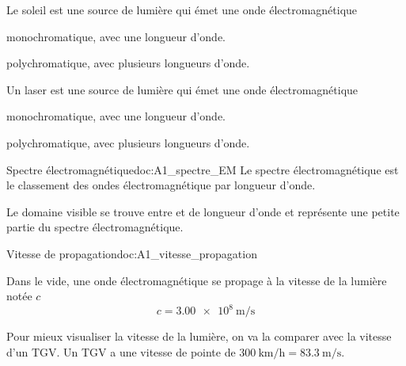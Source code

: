 \begin{qcm}{
  Le soleil est une source de lumière qui émet une onde électromagnétique
}
  \item monochromatique, avec une longueur d'onde.
  \item \reponseQCM polychromatique, avec plusieurs longueurs d'onde.
\end{qcm}

\begin{qcm}{
  Un laser est une source de lumière qui émet une onde électromagnétique
}
  \item \reponseQCM monochromatique, avec une longueur d'onde.
  \item polychromatique, avec plusieurs longueurs d'onde.
\end{qcm}


\begin{doc}{Spectre électromagnétique}{doc:A1_spectre_EM}
  Le spectre électromagnétique est le classement des ondes électromagnétique par longueur d'onde. 
  \begin{center}
  \end{center}
  Le domaine visible se trouve entre  et  de longueur d'onde et représente une petite partie du spectre électromagnétique.
\end{doc}



\begin{doc}{Vitesse de propagation}{doc:A1_vitesse_propagation}
  \begin{importants}
    Dans le vide, une onde électromagnétique se propage à la vitesse de la lumière notée $c$
    \begin{equation*}
      c = \qty{3,00e8}{\m\per\s}
    \end{equation*}
  \end{importants}
\end{doc}

Pour mieux visualiser la vitesse de la lumière, on va la comparer avec la vitesse d'un TGV.
Un TGV a une vitesse de pointe de $\qty{300}{\km\per\hour} = \qty{83,3}{\m\per\s}$.
  

